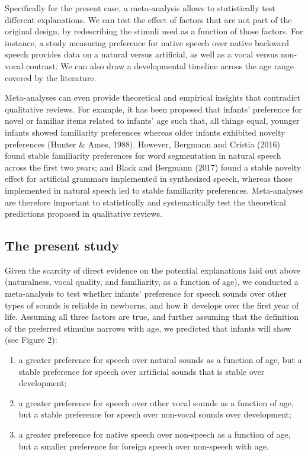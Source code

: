 \documentclass[man]{apa6}
\providecommand{\tightlist}{%
  \setlength{\itemsep}{0pt}\setlength{\parskip}{0pt}}
\begin{document}
Specifically for the present case, a meta-analysis allows to
statistically test different explanations. We can test the effect of
factors that are not part of the original design, by redescribing the
stimuli used as a function of those factors. For instance, a study
measuring preference for native speech over native backward speech
provides data on a natural versus artificial, as well as a vocal versus
non-vocal contrast. We can also draw a developmental timeline across the
age range covered by the literature.

Meta-analyses can even provide theoretical and empirical insights that
contradict qualitative reviews. For example, it has been proposed that
infants' preference for novel or familiar items related to infants' age
such that, all things equal, younger infants showed familiarity
preferences whereas older infants exhibited novelty preferences (Hunter
\& Ames, 1988). However, Bergmann and Cristia (2016) found stable
familiarity preferences for word segmentation in natural speech across
the first two years; and Black and Bergmann (2017) found a stable
novelty effect for artificial grammars implemented in synthesized
speech, whereas those implemented in natural speech led to stable
familiarity preferences. Meta-analyses are therefore important to
statistically and systematically test the theoretical predictions
proposed in qualitative reviews.

\subsection{The present study}\label{the-present-study}

Given the scarcity of direct evidence on the potential explanations laid
out above (naturalness, vocal quality, and familiarity, as a function of
age), we conducted a meta-analysis to test whether infants' preference
for speech sounds over other types of sounds is reliable in newborns,
and how it develops over the first year of life. Assuming all three
factors are true, and further assuming that the definition of the
preferred stimulus narrows with age, we predicted that infants will show
(see Figure 2):

\begin{enumerate}
\def\labelenumi{\arabic{enumi}.}
\tightlist
\item
  a greater preference for speech over natural sounds as a function of
  age, but a stable preference for speech over artificial sounds that is
  stable over development;
\item
  a greater preference for speech over other vocal sounds as a function
  of age, but a stable preference for speech over non-vocal sounds over
  development;
\item
  a greater preference for native speech over non-speech as a function
  of age, but a smaller preference for foreign speech over non-speech
  with age.
\end{enumerate}
\end{document}
